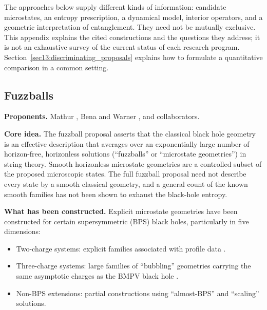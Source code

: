 \documentclass[11pt,letterpaper]{article}
\theoremstyle{plain}
\theoremstyle{definition}
\theoremstyle{remark}
\begin{document}
The approaches below supply different kinds of information: candidate
microstates, an entropy prescription, a dynamical model, interior operators,
and a geometric interpretation of entanglement. They need not be mutually
exclusive. This appendix explains the cited constructions and the questions
they address; it is not an exhaustive survey of the current status of each
research program. Section~\ref{sec13:discriminating_proposals} explains how
to formulate a quantitative comparison in a common setting.

\subsection{Fuzzballs}
\label{app:fuzzballs}

\textbf{Proponents.}  Mathur \cite{mathur2005}, Bena and Warner
\cite{benawarner2008}, and collaborators.

\medskip
\noindent
\textbf{Core idea.}  The fuzzball proposal asserts that the classical black
hole geometry is an effective description that averages over an exponentially
large number of horizon-free, horizonless solutions (``fuzzballs'' or
``microstate geometries'') in string theory.  Smooth horizonless microstate geometries are a controlled subset of the
proposed microscopic states.  The full fuzzball proposal need not describe
every state by a smooth classical geometry, and a general count of the known
smooth families has not been shown to exhaust the black-hole entropy.

\medskip
\noindent
\textbf{What has been constructed.}  Explicit microstate geometries have been
constructed for certain supersymmetric (BPS) black holes, particularly in five
dimensions:
\begin{itemize}
  \item Two-charge systems: explicit families associated with profile data
    \cite{mathur2005}.
  \item Three-charge systems: large families of ``bubbling'' geometries
    carrying the same asymptotic charges as the BMPV black hole
    \cite{benawarner2008}.
  \item Non-BPS extensions: partial constructions using ``almost-BPS'' and
    ``scaling'' solutions.
\end{itemize}
\end{document}

